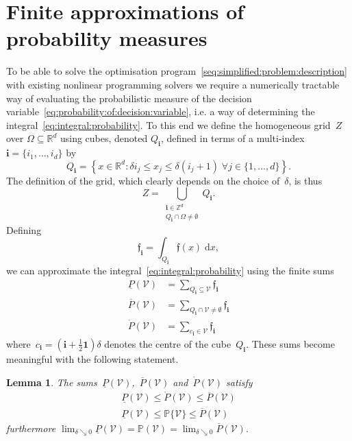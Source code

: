 \documentclass[letterpaper, 10pt, conference]{ieeeconf} %
\newtheorem{thm}{Lemma}[section]
\providecommand{\bfa}[1]{\mathbf{#1}}
\begin{document}
\section{Finite approximations of probability measures}\label{sec:counting:cubes}
%
%
%
%
\noindent To be able to solve the optimisation program~\eqref{seq:simplified:problem:description} with existing nonlinear programming solvers we require a numerically tractable way of evaluating the probabilistic measure of the decision variable~\eqref{eq:probability:of:decision:variable}, i.e. a way of determining the integral~\eqref{eq:integral:probability}.
%
To this end we define the homogeneous grid~$Z$ over $\Omega\subseteq\mathbb R^d$ using cubes, denoted $Q_{\bfa{i}}$, defined in terms of a multi-index $\bfa{i}=\{i_1,\ldots,i_d\}$ by
%
\begin{equation}
	Q_{\bfa{i}} =\left\{x\in\mathbb R^d: \delta i_j \leq x_j\leq\delta (i_j+1)\;\forall j\in\{1,\dots,d\} \right\} .
\end{equation}
%
The definition of the grid, which clearly depends on the choice of~$\delta$, is thus
%
\begin{equation}
	Z = \bigcup_{\substack{\bfa{i}\in\mathbb Z^d\\ Q_\bfa{i}\cap\Omega\neq\emptyset}} Q_\bfa{i} .
\end{equation}
%
Defining
%
\begin{equation}
	\mathfrak f_\bfa{i} = \int_{Q_\bfa{i}}\mathfrak f(x)\; \mathrm d x ,
\end{equation}
%
we can approximate the integral~\eqref{eq:integral:probability} using the finite sums
%
\begin{align}
\underline{P}(\mathcal V) &= \sum_{Q_\bfa{i}\subseteq\mathcal V}\mathfrak f_\bfa{i}\label{eq:inner:approx}\\
\overline{P}(\mathcal V) &= \sum_{Q_\bfa{i}\cap\mathcal V\neq\emptyset}\mathfrak f_\bfa{i} \label{eq:outer:approx}\\
\mathring{P}(\mathcal V) &= \sum_{c_\bfa{i}\in\mathcal V}\mathfrak f_\bfa{i}\label{eq:center:approx}
\end{align}
%
where~$c_\bfa{i}=(\bfa{i}+\frac{1}{2}\bfa{1})\delta$ denotes the centre of the cube~$Q_\bfa{i}$.
%
These sums become meaningful with the following statement.
%
\begin{thm}\label{thm:sandwich:inequality}
The sums~$\underline P(\mathcal V)$,~$\overline{P}(\mathcal V)$ and~$\mathring{P}(\mathcal V)$ satisfy
%
\begin{align}
\underline{P}(\mathcal V)\leq \mathring{P}(\mathcal V)\leq\overline{P}(\mathcal V)\label{eq:sandwich:synthetical}\\
\underline{P}(\mathcal V)\leq \mathbb P\{\mathcal V\}\leq\overline{P}(\mathcal V)\label{eq:sandwich:analytical}
\end{align}
%
furthermore $\lim_{\delta\searrow0}\underline{P}(\mathcal V)=\mathbb{P}(\mathcal V)=\lim_{\delta\searrow0}\overline{P}(\mathcal V)$.
\end{thm}
\end{document}
